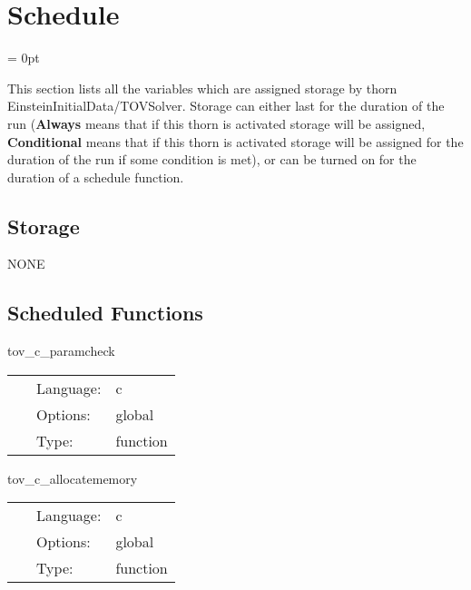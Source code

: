 
\section{Schedule} 


\parskip = 0pt


\noindent This section lists all the variables which are assigned storage by thorn EinsteinInitialData/TOVSolver.  Storage can either last for the duration of the run ({\bf Always} means that if this thorn is activated storage will be assigned, {\bf Conditional} means that if this thorn is activated storage will be assigned for the duration of the run if some condition is met), or can be turned on for the duration of a schedule function.


\subsection*{Storage}NONE
\subsection*{Scheduled Functions}
\vspace{5mm}


\hspace{5mm} tov\_c\_paramcheck 

\hspace{5mm}{\it check parameters } 


\hspace{5mm}

 \begin{tabular*}{160mm}{cll} 
~ & Language:  & c \\ 
~ & Options:  & global \\ 
~ & Type:  & function \\ 
\end{tabular*} 


\vspace{5mm}


\hspace{5mm} tov\_c\_allocatememory 

\hspace{5mm}{\it allocate memory for tovsolver\_c } 


\hspace{5mm}

 \begin{tabular*}{160mm}{cll} 
~ & Language:  & c \\ 
~ & Options:  & global \\ 
~ & Type:  & function \\ 
\end{tabular*} 


